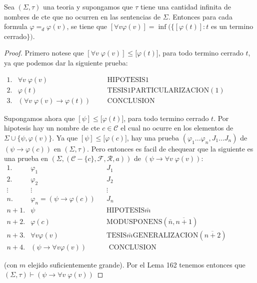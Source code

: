   \begin{lemma}
    Sea \((\Sigma ,\tau )\) una teoria y supongamos que \( \tau \) tiene una cantidad infinita de nombres de cte que no ocurren en las sentencias de \(\Sigma \). Entonces para cada formula \(\varphi =_{d}\varphi (v) \), se tiene que \([\forall v\varphi (v)]=\inf (\{[\varphi (t)]:t\) es un termino cerrado\(\})\).
  \end{lemma}
  \begin{proof}
    Primero notese que \([\forall v\;\varphi (v)]\leq \lbrack \varphi (t)]\), para todo termino cerrado \(t\), ya que podemos dar la siguiente prueba:

    \(\displaystyle \begin{array}{cllll} 1. & \forall v\;\varphi (v) & & & \text{HIPOTESIS}1 \\ 2. & \varphi (t) & & & \text{TESIS}1\text{PARTICULARIZACION}(1) \\ 3. & (\forall v\;\varphi (v)\rightarrow \varphi (t)) & & & \text{CONCLUSION } \end{array} \)

    Supongamos ahora que \([\psi ]\leq \lbrack \varphi (t)]\), para todo termino cerrado \(t.\) Por hipotesis hay un nombre de cte \(c\in \mathcal{C}\) el cual no ocurre en los elementos de \(\Sigma \cup \{\psi ,\varphi (v)\}.\) Ya que \( [\psi ]\leq \lbrack \varphi (c)]\), hay una prueba \((\varphi _{1}...\varphi _{n},J_{1}...J_{n})\) de \(\left( \psi \rightarrow \varphi (c)\right) \) en \( (\Sigma ,\tau )\). Pero entonces es facil de chequear que la siguiente es una prueba en \((\Sigma ,(\mathcal{C}-\{c\},\mathcal{F},\mathcal{R},a))\) de \( \left( \psi \rightarrow \forall v\;\varphi (v)\right) \):
    \(\displaystyle \begin{array}{rlcl} 1. & \varphi _{1} & & J_{1} \\ 2. & \varphi _{2} & & J_{2} \\ \vdots & \vdots & & \vdots \\ n. & \varphi _{n}=\left( \psi \rightarrow \varphi (c)\right) & & J_{n} \\ n+1. & \psi & & \text{HIPOTESIS}\bar{m} \\ n+2. & \varphi (c) & & \text{MODUSPONENS}(\bar{n},\overline{n+1}) \\ n+3. & \forall v\varphi (v) & & \text{TESIS}\bar{m}\text{GENERALIZACION}( \overline{n+2}) \\ n+4. & \left( \psi \rightarrow \forall v\varphi (v)\right) & & \text{ CONCLUSION} \end{array} \)

    (con \(m\) elejido suficientemente grande). Por el Lema 162 tenemos entonces que \((\Sigma ,\tau )\vdash \left( \psi \rightarrow \forall v\;\varphi (v)\right) \)
  \end{proof}


